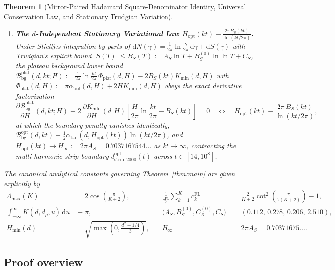 \documentclass[11pt,reqno]{amsart}
\newtheorem{theorem}{Theorem}[section]
\theoremstyle{definition}
\theoremstyle{remark}
\numberwithin{equation}{section}
\newcommand{\dd}{\mathrm{d}}
\begin{document}
\begin{theorem}[Mirror-Paired Hadamard Square-Denominator Identity, Universal Conservation Law, and Stationary Trudgian Variation]
\begin{enumerate}[label=\textup{(\roman*)},leftmargin=2.2em]
\item \textbf{The $d$-Independent Stationary Variational Law $H_{\mathrm{opt}}(kt) \equiv \frac{2\pi B_S(kt)}{\ln(kt/2\pi)}$.} Under Stieltjes integration by parts of $\dd N(\gamma) = \frac{1}{2\pi}\ln\frac{\gamma}{2\pi}\,\dd\gamma + \dd S(\gamma)$ with Trudgian's explicit bound $|S(T)| \le B_S(T) := A_S\ln T + B_S^{(0)}\ln\ln T + C_S$, the plateau background lower bound $\mathcal{B}_{\mathrm{bg}}^{\mathrm{plat}}(d,kt;H) := \frac{1}{2\pi}\ln\frac{kt}{2\pi}\,\Phi_{\mathrm{plat}}(d,H) - 2B_S(kt)K_{\min}(d,H)$ with $\Phi_{\mathrm{plat}}(d,H) := \pi\alpha_{\mathrm{tail}}(d,H) + 2H K_{\min}(d,H)$ obeys the exact derivative factorization
\begin{equation}\label{eq:intro_stationary}
\frac{\partial\mathcal{B}_{\mathrm{bg}}^{\mathrm{plat}}}{\partial H}(d,kt;H) \equiv 2\,\frac{\partial K_{\min}}{\partial H}(d,H)\left[\frac{H}{2\pi}\ln\frac{kt}{2\pi} - B_S(kt)\right] = 0 \quad\Longleftrightarrow\quad H_{\mathrm{opt}}(kt) \equiv \frac{2\pi\,B_S(kt)}{\ln(kt/2\pi)},
\end{equation}
at which the boundary penalty vanishes identically, $\mathcal{B}_{\mathrm{bg}}^{\mathrm{opt}}(d,kt) \equiv \frac{1}{2}\alpha_{\mathrm{tail}}(d, H_{\mathrm{opt}}(kt))\ln(kt/2\pi)$, and $H_{\mathrm{opt}}(kt) \to H_\infty := 2\pi A_S = 0.7037167544\dots$ as $kt \to \infty$, contracting the multi-harmonic strip boundary $d_{\mathrm{strip},2000}^{\mathrm{opt}}(t)$ across $t \in [14, 10^8]$.
\end{enumerate}
The canonical analytical constants governing Theorem~\ref{thm:main} are given explicitly by
\begin{equation}\label{eq:canonical_constants}
\begin{aligned}
\Lambda_{\max}(K) &= 2\cos\!\left(\frac{\pi}{K+2}\right), \quad & \frac{1}{c_0^{\mathrm{FL}}}\sum_{k=1}^K c_k^{\mathrm{FL}} &= \frac{2}{K+2}\cot^2\!\left(\frac{\pi}{2(K+2)}\right) - 1, \\
\int_{-\infty}^{\infty} K(d,d_\rho,u)\,\dd u &\equiv \pi, \quad & \bigl(A_S, B_S^{(0)}, C_S^{(0)}, C_S\bigr) &= (0.112,\,0.278,\,0.206,\,2.510), \\
H_{\min}(d) &= \sqrt{\max\!\left(0, \frac{d^2 - 1/4}{3}\right)}, \quad & H_\infty &= 2\pi A_S = 0.70371675\dots.
\end{aligned}
\end{equation}
\end{theorem}

\subsection{Proof overview}\label{subsec:proof_overview}
\end{document}
